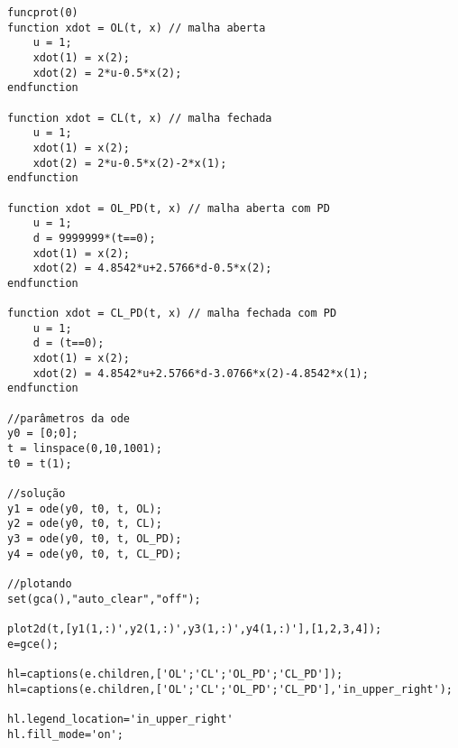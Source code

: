 \begin{lstlisting}
funcprot(0)
function xdot = OL(t, x) // malha aberta 
    u = 1;
    xdot(1) = x(2);
    xdot(2) = 2*u-0.5*x(2);
endfunction

function xdot = CL(t, x) // malha fechada
    u = 1;
    xdot(1) = x(2);
    xdot(2) = 2*u-0.5*x(2)-2*x(1);
endfunction

function xdot = OL_PD(t, x) // malha aberta com PD    
    u = 1;
    d = 9999999*(t==0);
    xdot(1) = x(2);
    xdot(2) = 4.8542*u+2.5766*d-0.5*x(2);
endfunction

function xdot = CL_PD(t, x) // malha fechada com PD
    u = 1;
    d = (t==0);
    xdot(1) = x(2);
    xdot(2) = 4.8542*u+2.5766*d-3.0766*x(2)-4.8542*x(1);
endfunction

//parâmetros da ode
y0 = [0;0];
t = linspace(0,10,1001);
t0 = t(1);

//solução
y1 = ode(y0, t0, t, OL);
y2 = ode(y0, t0, t, CL);
y3 = ode(y0, t0, t, OL_PD);
y4 = ode(y0, t0, t, CL_PD);

//plotando
set(gca(),"auto_clear","off");

plot2d(t,[y1(1,:)',y2(1,:)',y3(1,:)',y4(1,:)'],[1,2,3,4]);
e=gce();

hl=captions(e.children,['OL';'CL';'OL_PD';'CL_PD']);
hl=captions(e.children,['OL';'CL';'OL_PD';'CL_PD'],'in_upper_right');

hl.legend_location='in_upper_right'
hl.fill_mode='on';
\end{lstlisting}
\pagebreak